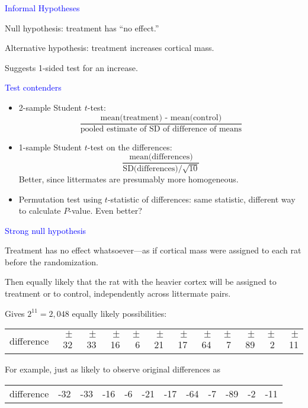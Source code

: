 \documentclass[landscape]{slides}
\begin{document}
\begin {slide}
{\textcolor{blue}{\sc Informal Hypotheses}}

{\textcolor{one}{Null hypothesis:}} treatment has ``no effect.''

{\textcolor{one}{Alternative hypothesis:}} treatment increases cortical mass.

Suggests 1-sided test for an increase.

\end{slide}

\begin {slide}
{\textcolor{blue}{\sc Test contenders}}

\begin{itemize}
	\item 2-sample Student $t$-test: 
              $$ 
              \frac{\mbox{mean(treatment) - mean(control)}}
                   {\mbox{pooled estimate of SD of difference of means}}
              $$
	\item 1-sample Student $t$-test on the differences: 
	      $$
	      \frac{\mbox{mean(differences)}}{\mbox{SD(differences)}/\sqrt{10}}
              $$  
              Better, since littermates are presumably more homogeneous.
	\item Permutation test using $t$-statistic of differences:
	      same statistic, different way to calculate $P$-value.
	      Even better?
\end{itemize}

\end{slide}


\begin {slide}
{\textcolor{blue}{\sc Strong null hypothesis}}

{\textcolor{one}{Treatment has no effect whatsoever---as if cortical mass were 
assigned to each rat before the randomization.}}

Then equally likely that the rat with the heavier cortex will be assigned
to treatment or to control, independently across littermate pairs.

Gives $2^{11} = 2,048$ equally likely possibilities:

{\small
\begin{tabular}{lrrrrrrrrrrr}
difference & $\pm$32& $\pm$33& $\pm$16& $\pm$6& $\pm$21& $\pm$17& 
             $\pm$64& $\pm$7& $\pm$89& $\pm$2& $\pm$11
\end{tabular}
}

For example, just as likely to observe original differences as
{\small
\begin{tabular}{lrrrrrrrrrrr}
	difference & -32& -33& -16& -6& -21& -17& -64& -7& -89& -2& -11
\end{tabular}
}


\end{slide}
\end{document}
